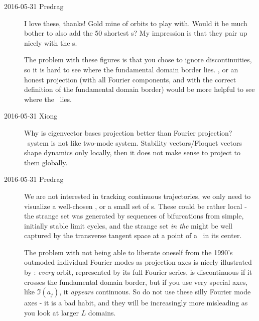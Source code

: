 \begin{description}
\item[2016-05-31 Predrag]
I love these, thanks! Gold mine of orbits to play with. Would it be much
bother to also add the 50 shortest \ppo s? My impression is that they
pair up nicely with the \rpo s.

The problem with these figures is that you chose to ignore
discontinuities, so it is hard to see where the fundamental domain border
lies. , or an honest projection (with all Fourier
components, and with the correct definition of the fundamental domain
border) would be more helpful to see where the \PoincSec\ lies.


\item[2016-05-31 Xiong]
Why is eigenvector bases projection better than Fourier projection? \KS\ system
is not like two-mode system. Stability vectors/Floquet vectors shape dynamics
only locally, then it does not make sense to project to them globally.

\item[2016-05-31 Predrag]
We are not interested in tracking continuous trajectories, we only need
to visualize a well-chosen \PoincSec, or a small set of \PoincSec s.
These could be rather local - the strange set was generated by sequences
of bifurcations from simple, initially stable limit cycles, and
the strange set \emph{in the \PoincSec} might be well captured by the
transverse tangent space at a point of a \po\ in its center.

The problem with not being able to liberate oneself from the 1990's
outmoded individual Fourier modes as projection axes is nicely
illustrated by : \emph{every} orbit, represented by
its full Fourier series, is discontinuous if it crosses the fundamental
domain border, but if you use very special axes, like $\Im(a_j)$, it
\emph{appears} continuous. So do not use these silly Fourier mode axes -
it is a bad habit, and they will be increasingly more misleading as you
look at larger $L$ domains.


\end{description}
